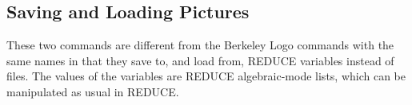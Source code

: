 







\subsection{Saving and Loading Pictures}
\label{logoturtle:SLP}

These two commands are different from the Berkeley Logo commands with
the same names in that they save to, and load from, REDUCE variables
instead of files.  The values of the variables are REDUCE
algebraic-mode lists, which can be manipulated as usual in REDUCE.

